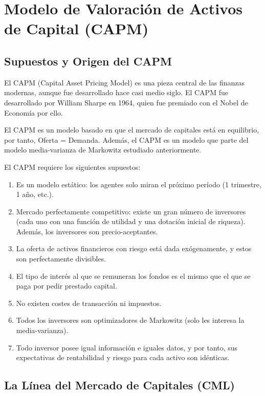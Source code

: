 \section{Modelo de Valoración de Activos de Capital (CAPM)}

\subsection{Supuestos y Origen del CAPM}

El CAPM (Capital Asset Pricing Model) es una pieza central de las finanzas modernas, aunque fue desarrollado hace casi medio siglo. El CAPM fue desarrollado por William Sharpe en 1964, quien fue premiado con el Nobel de Economía por ello.

El CAPM es un modelo basado en que el mercado de capitales está en equilibrio, por tanto, Oferta = Demanda. Además, el CAPM es un modelo que parte del modelo media-varianza de Markowitz estudiado anteriormente.

\begin{definicion}
El CAPM requiere los siguientes supuestos:
\begin{enumerate}
\item Es un modelo estático: los agentes solo miran el próximo período (1 trimestre, 1 año, etc.).
\item Mercado perfectamente competitivo: existe un gran número de inversores (cada uno con una función de utilidad y una dotación inicial de riqueza). Además, los inversores son precio-aceptantes.
\item La oferta de activos financieros con riesgo está dada exógenamente, y estos son perfectamente divisibles.
\item El tipo de interés al que se remuneran los fondos es el mismo que el que se paga por pedir prestado capital.
\item No existen costes de transacción ni impuestos.
\item Todos los inversores son optimizadores de Markowitz (solo les interesa la media-varianza).
\item Todo inversor posee igual información e iguales datos, y por tanto, sus expectativas de rentabilidad y riesgo para cada activo son idénticas.
\end{enumerate}
\end{definicion}

\subsection{La Línea del Mercado de Capitales (CML)}

